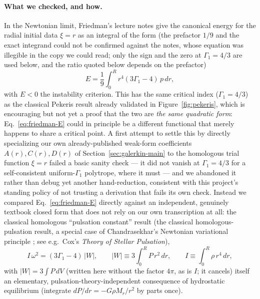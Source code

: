 \documentclass[11pt]{article}
\begin{document}
\paragraph{What we checked, and how.} In the Newtonian limit, Friedman's lecture notes give the canonical energy for the radial initial data $\xi=r$ as an integral of the form (the prefactor $1/9$ and the exact integrand could not be confirmed against the notes, whose equation was illegible in the copy we could read; only the sign and the zero at $\Gamma_1=4/3$ are used below, and the ratio quoted below depends on the prefactor)
\begin{equation}
E=\frac{1}{9}\int_0^R r^4(3\Gamma_1-4)\,p\,dr,
\label{eq:friedman-E}
\end{equation}
with $E<0$ the instability criterion. This has the same critical index ($\Gamma_1=4/3$) as the classical Pekeris result already validated in Figure~\ref{fig:pekeris}, which is encouraging but not yet a proof that the two are \emph{the same quadratic form}: Eq.~\eqref{eq:friedman-E} could in principle be a different functional that merely happens to share a critical point. A first attempt to settle this by directly specializing our own already-published weak-form coefficients $A(r),C(r),D(r)$ of Section~\ref{sec:galerkin-main} to the homologous trial function $\xi=r$ failed a basic sanity check --- it did not vanish at $\Gamma_1=4/3$ for a self-consistent uniform-$\Gamma_1$ polytrope, where it must --- and we abandoned it rather than debug yet another hand-reduction, consistent with this project's standing policy of not trusting a derivation that fails its own check. Instead we compared Eq.~\eqref{eq:friedman-E} directly against an independent, genuinely textbook closed form that does not rely on our own transcription at all: the classical homologous ``pulsation constant'' result (the classical homologous-pulsation result, a special case of Chandrasekhar's Newtonian variational principle \citep{Chandrasekhar1964}; see e.g.\ Cox's \emph{Theory of Stellar Pulsation}),
\begin{equation}
I\,\omega^2=(3\Gamma_1-4)\,|W|,\qquad |W|\equiv3\int_0^R P\,r^2\,dr,\qquad I\equiv\int_0^R\rho\,r^4\,dr,
\label{eq:virial-pulsation}
\end{equation}
with $|W|=3\int P\,dV$ (written here without the factor $4\pi$, as is $I$; it cancels) itself an elementary, pulsation-theory-independent consequence of hydrostatic equilibrium (integrate $dP/dr=-G\rho M_r/r^2$ by parts once).
\end{document}
